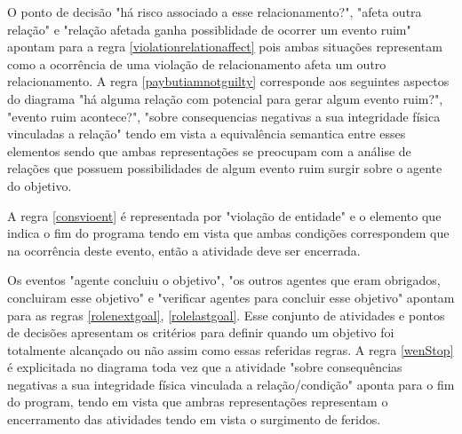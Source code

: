 O ponto de decisão "há risco associado a esse relacionamento?", "afeta  outra relação" e "relação afetada ganha possiblidade de ocorrer um evento ruim" apontam para a regra \ref{violationrelationaffect} pois ambas situações representam como a 
ocorrência de uma violação de relacionamento afeta um outro relacionamento. A regra \ref{paybutiamnotguilty} corresponde aos seguintes aspectos do diagrama "há alguma relação com potencial para gerar algum evento ruim?", "evento ruim acontece?",
"sobre consequencias negativas a sua integridade física vinculadas a relação" tendo em vista a equivalência semantica entre esses elementos sendo que ambas representações se preocupam com a análise de relações que possuem possibilidades 
de algum evento ruim surgir sobre o agente do objetivo. 

A regra \ref{consvioent} é representada por "violação de entidade" e o elemento que indica o fim do programa tendo em vista que ambas condições correspondem que na ocorrência deste evento, então a atividade deve ser encerrada.

Os eventos "agente concluiu o objetivo", "os outros agentes que eram obrigados, concluiram esse objetivo" e "verificar agentes para concluir esse objetivo" apontam para as regras \ref{rolenextgoal}, \ref{rolelastgoal}. Esse conjunto de atividades 
e pontos de decisões apresentam os critérios para definir quando um objetivo foi totalmente alcançado ou não assim como essas referidas regras.  A regra \ref{wenStop} é explicitada no diagrama toda vez que a atividade "sobre consequências negativas 
a sua integridade física vinculada a relação/condição" aponta para o fim do program, tendo em vista que ambras representações representam o encerramento das atividades tendo em vista o surgimento de feridos. 

